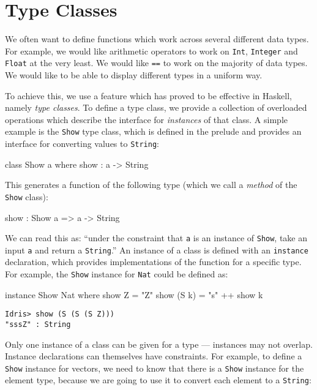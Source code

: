 \section{Type Classes}
\label{sec:classes}

We often want to define functions which work across several different data types.
For example, we would like arithmetic operators to work on \texttt{Int}, \texttt{Integer} and \texttt{Float} at the very least.
We would like \texttt{==} to work on the majority of data types.
We would like to be able to display different types in a uniform way.

To achieve this, we use a feature which has proved to be effective in Haskell, namely \emph{type classes}.
To define a type class, we provide a collection of overloaded operations which describe the interface for \emph{instances} of that class.
A simple example is the \texttt{Show} type class, which is defined in the prelude and provides an interface for converting values to \texttt{String}:

\begin{code}
class Show a where
    show : a -> String
\end{code}

\noindent
This generates a function of the following type (which we call a \emph{method} of the  \texttt{Show} class):

\begin{code}
show : Show a => a -> String
\end{code}

\noindent
We can read this as: ``under the constraint that \texttt{a} is an instance of \texttt{Show}, take an input \texttt{a} and return a \texttt{String}.''
An instance of a class is defined with an \texttt{instance} declaration, which provides implementations of the function for a specific type.
For example, the \texttt{Show} instance for \texttt{Nat} could be defined as:

\begin{code}
instance Show Nat where
    show Z = "Z"
    show (S k) = "s" ++ show k
\end{code}

\begin{lstlisting}[style=stdout]
Idris> show (S (S (S Z)))
"sssZ" : String
\end{lstlisting}

\noindent
Only one instance of a class can be given for a type --- instances may not overlap.
Instance declarations can themselves have constraints.
For example, to define a \texttt{Show} instance for vectors, we need to know that there is a \texttt{Show}  instance for the element type, because we are going to use it to convert each element to a \texttt{String}:

